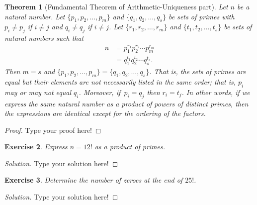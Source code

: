 \documentclass[12pt,leqno]{article}
\numberwithin{equation}{section}
\newtheorem{thm}{Theorem}[section]
\newtheorem{exer}[thm]{Exercise}
\theoremstyle{definition}
\begin{document}

\begin{thm}[Fundamental Theorem of Arithmetic-Uniqueness part]
Let $n$ be a natural number.  Let $\{p_1, p_2, \hdots, p_m\}$ and
$\{q_1, q_2, \hdots, q_s\}$ be sets of primes with $p_i \neq p_j$ if
$i \neq j$ and $q_i \neq q_j$ if $i \neq j$. Let $\{r_1, r_2,
\hdots, r_m\}$ and $\{t_1, t_2, \hdots, t_s\}$ be sets of natural
numbers such that
\begin{align*}
n & = p_1^{r_1}p_2^{r_2}\cdots p_m^{r_m} \\
  & = q_1^{t_1}q_2^{t_2}\cdots q_s^{t_s}.
\end{align*}
Then $m = s$ and $\{p_1, p_2, \hdots, p_m\} = \{q_1, q_2, \hdots,
q_s\}$. That is, the sets of primes are equal but their elements are
not necessarily listed in the same order; that is, $p_i$ may or may
not equal $q_i$.  Moreover, if~$p_i = q_j$ then $r_i = t_j$.  In
other words, if we express the same natural number as a product of
powers of distinct primes, then the expressions are identical except
for the ordering of the factors.
\end{thm}

\begin{proof}[Proof]
Type your proof here!
\end{proof}

\setcounter{thm}{9}


\begin{exer}
Express $n = 12!$ as a product of primes.
\end{exer}

\begin{proof}[Solution]
Type your solution here!
\end{proof}


\begin{exer}
Determine the number of zeroes at the end of $25!$.
\end{exer}

\begin{proof}[Solution]
Type your solution here!
\end{proof}

\end{document}
